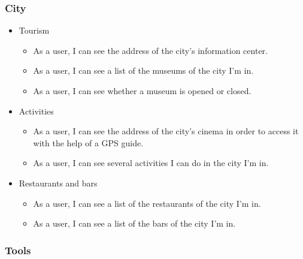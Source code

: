 \documentclass[11pt, a4paper]{report}
\begin{document}
\subsubsection{City}

\begin{itemize}

\item Tourism
\begin{itemize} 
\item As a user, I can see the address of the city's information center.
\item As a user, I can see a list of the museums of the city I'm in.
\item As a user, I can see whether a museum is opened or closed.
\end{itemize}

\item Activities
\begin{itemize} 
\item As a user, I can see the address of the city's cinema in order to access it with the help of a GPS guide.
\item As a user, I can see several activities I can do in the city I'm in.

\end{itemize}

\item Restaurants and bars
\begin{itemize} 
\item As a user, I can see a list of the restaurants of the city I'm in.
\item As a user, I can see a list of the bars of the city I'm in.
\end{itemize}

\end{itemize}

\subsubsection{Tools}
\end{document}
